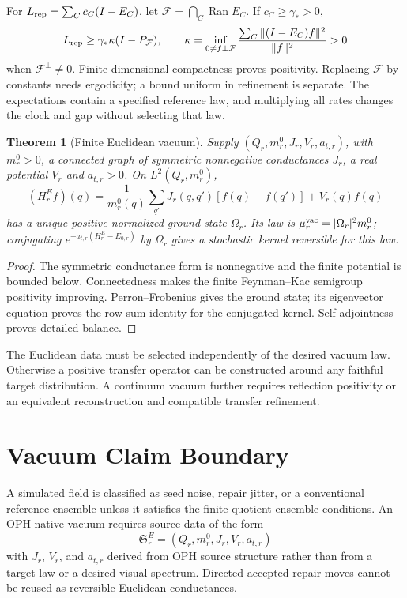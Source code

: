 \documentclass[11pt]{article}
\newtheorem{theorem}{Theorem}[section]
\theoremstyle{remark}
\theoremstyle{plain}
\begin{document}
For \(L_{\rm rep}=\sum_Cc_C(I-E_C)\), let
\(\mathcal F=\bigcap_C\operatorname{Ran}E_C\). If \(c_C\ge\gamma_*>0\),
\[
 L_{\rm rep}\ge\gamma_*\kappa(I-P_{\mathcal F}),\qquad
 \kappa=\inf_{0\ne f\perp\mathcal F}
 \frac{\sum_C\|(I-E_C)f\|^2}{\|f\|^2}>0
\]
when \(\mathcal F^\perp\ne0\). Finite-dimensional compactness proves
positivity. Replacing \(\mathcal F\) by constants needs ergodicity;
a bound uniform in refinement is separate. The expectations
contain a specified reference law, and multiplying all rates changes the clock and
gap without selecting that law.

\begin{theorem}[Finite Euclidean vacuum]
Supply \((Q_r,m_r^0,J_r,V_r,a_{t,r})\), with \(m_r^0>0\), a connected
graph of symmetric nonnegative conductances \(J_r\), a real potential
\(V_r\) and \(a_{t,r}>0\). On \(L^2(Q_r,m_r^0)\),
\[
 (H_r^Ef)(q)=\frac1{m_r^0(q)}\sum_{q'}J_r(q,q')[f(q)-f(q')]+V_r(q)f(q)
\]
has a unique positive normalized ground state \(\Omega_r\). Its law is
\(\mu_r^{\rm vac}=|\Omega_r|^2m_r^0\); conjugating
\(e^{-a_{t,r}(H_r^E-E_{0,r})}\) by \(\Omega_r\) gives a stochastic
kernel reversible for this law.
\end{theorem}
\begin{proof}
The symmetric conductance form is nonnegative and the finite potential
is bounded below. Connectedness makes the finite Feynman--Kac semigroup
positivity improving. Perron--Frobenius gives the ground state; its
eigenvector equation proves the row-sum identity for the conjugated kernel.
Self-adjointness proves detailed balance.
\end{proof}
The Euclidean data must be selected independently of the desired vacuum
law. Otherwise a positive transfer operator can be constructed around any
faithful target distribution. A continuum vacuum further requires
reflection positivity or an equivalent reconstruction and compatible
transfer refinement.

\section{Vacuum Claim Boundary}
\label{sec:vacuum-claim-boundary}

A simulated field is classified as seed noise, repair jitter, or a conventional
reference ensemble unless it satisfies the finite quotient ensemble
conditions. An OPH-native vacuum requires source data of the form
\[
\mathfrak S_r^E=(Q_r,m_r^0,J_r,V_r,a_{t,r})
\]
with \(J_r\), \(V_r\), and \(a_{t,r}\) derived from OPH source structure rather than from a target
law or a desired visual spectrum. Directed accepted repair moves cannot be
reused as reversible Euclidean conductances.
\end{document}
